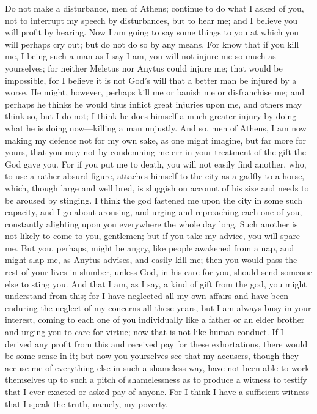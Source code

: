 \documentclass[letterpaper,12pt]{article}
\newcommand{\stephpag}[1]{\marginnote{\small\itshape\fontfamily{ppl}\selectfont #1}}
\begin{document}
Do not make a disturbance, men of Athens; continue to do what I asked of you, not to interrupt my speech by disturbances, but to hear me; and I believe you will profit by hearing. Now I am going to say some things to you at which you will perhaps cry out; but do not do so by any means. For know that if you kill me, I being such a man as I say I am, you will not injure me so much as yourselves; for neither Meletus nor Anytus could injure me; \stephpag{d} that would be impossible, for I believe it is not God's will that a better man be injured by a worse. He might, however, perhaps kill me or banish me or disfranchise me; and perhaps he thinks he would thus inflict great injuries upon me, and others may think so, but I do not; I think he does himself a much greater injury by doing what he is doing now---killing a man unjustly. And so, men of Athens, I am now making my defence not for my own sake, as one might imagine, but far more for yours, that you may not by condemning me err in your treatment of the gift the God gave you. \stephpag{e} For if you put me to death, you will not easily find another, who, to use a rather absurd figure, attaches himself to the city as a gadfly to a horse, which, though large and well bred, is sluggish on account of his size and needs to be aroused by stinging. I think the god fastened me upon the city in some such capacity, and I go about arousing, \stephpag{31 a} and urging and reproaching each one of you, constantly alighting upon you everywhere the whole day long. Such another is not likely to come to you, gentlemen; but if you take my advice, you will spare me. But you, perhaps, might be angry, like people awakened from a nap, and might slap me, as Anytus advises, and easily kill me; then you would pass the rest of your lives in slumber, unless God, in his care for you, should send someone else to sting you. And that I am, as I say, a kind of gift from the god, \stephpag{b} you might understand from this; for I have neglected all my own affairs and have been enduring the neglect of my concerns all these years, but I am always busy in your interest, coming to each one of you individually like a father or an elder brother and urging you to care for virtue; now that is not like human conduct. If I derived any profit from this and received pay for these exhortations, there would be some sense in it; but now you yourselves see that my accusers, though they accuse me of everything else in such a shameless way, have not been able to work themselves up to such a pitch of shamelessness \stephpag{c} as to produce a witness to testify that I ever exacted or asked pay of anyone. For I think I have a sufficient witness that I speak the truth, namely, my poverty.
\end{document}
